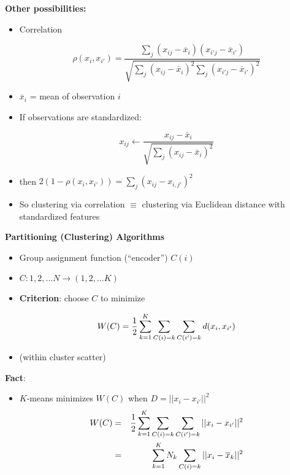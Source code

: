 \begin{slide}

{\bf Other possibilities:}

\begin{itemize}

\item Correlation

$$\rho (x_i, x_{i'}) =
\displaystyle\frac {\sum_j (x_{ij} - \overline x_i) (x_{i' j} - \overline x_{i'} )}
{ \sqrt{\sum_j (x_{ij} - \overline x_i )^2 \sum_j (x_{i'j} - \overline x_{i'})^2 }}$$

\item[ ] $\overline x_i$ = mean of observation $i$ 

\item If observations are standardized:

$$x_{ij} \leftarrow \frac{ x_{ij} - \bar x_{i} }
{\sqrt{ \sum_j (x_{ij} - \bar x_i)^2} } $$

\item[] then $2(1 - \rho (x_i, x_{i'} )) = \sum_j (x_{ij} - x_{i, j'})^2$
\item[] So clustering via correlation $\equiv$ clustering via Euclidean distance with standardized features

\end{itemize}

\newpage


{\bf Partitioning (Clustering) Algorithms}

\begin{itemize}

\item Group assignment function (``encoder'') $C(i)$

\item[] $C: 1, 2, ... N \rightarrow (1, 2, ...K)$

\item {\bf Criterion}: choose $C$ to minimize

$$W (C) = {1\over 2} \sum^K_{k=1} \sum_{C(i)=k} \sum_{C({i'})=k} d (x_i , x_{i'} ) $$ %

\item[] (within cluster scatter)

\end{itemize}

\newpage

{\bf Fact}:

\begin{itemize}
\item $K$-means minimizes $W(C)$ when $D = || x_i - x_{i'} ||^2$
\begin{eqnarray*}
W(C) & = &{1\over 2} \sum^K_{k=1} \sum_{C(i)=k} \sum_{C(i')=k} || x_i - x_{i'} ||^2 \\
& = &\sum^K_{k=1} N_k \sum_{C(i)=k} || x_i - \overline x_k ||^2 %
\end{eqnarray*}


\end{itemize}
\end{slide}
